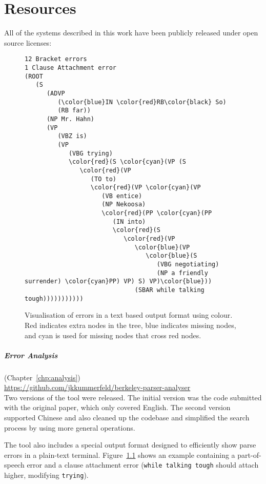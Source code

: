 \chapter{Resources}

All of the systems described in this work have been publicly released under open source licenses:

\begin{figure}
{\footnotesize
  \begin{Verbatim}[commandchars=\\\{\},codes={\catcode`$=3\catcode`^=7\catcode`_=8}]
12 Bracket errors
1 Clause Attachment error
(ROOT
   (S
      (ADVP
         (\color{blue}IN \color{red}RB\color{black} So)
         (RB far))
      (NP Mr. Hahn)
      (VP
         (VBZ is)
         (VP
            (VBG trying)
            \color{red}(S \color{cyan}(VP (S
               \color{red}(VP
                  (TO to)
                  \color{red}(VP \color{cyan}(VP
                     (VB entice)
                     (NP Nekoosa)
                     \color{red}(PP \color{cyan}(PP
                        (IN into)
                        \color{red}(S
                           \color{red}(VP
                              \color{blue}(VP
                                 \color{blue}(S
                                    (VBG negotiating)
                                    (NP a friendly surrender) \color{cyan}PP) VP) S) VP)\color{blue}))
                              (SBAR while talking tough)))))))))))
\end{Verbatim}
}
\caption{\label{fig:error-vis}
Visualisation of errors in a text based output format using colour.
Red indicates extra nodes in the tree, blue indicates missing nodes, and cyan is used for missing nodes that cross red nodes.
}
\end{figure}

\paragraph{Error Analysis} (Chapter~\ref{chp:analysis}) \\
\url{https://github.com/jkkummerfeld/berkeley-parser-analyser} \\
Two versions of the tool were released.
The initial version was the code submitted with the original paper, which only covered English.
The second version supported Chinese and also cleaned up the codebase and simplified the search process by using more general operations.

The tool also includes a special output format designed to efficiently show parse errors in a plain-text terminal.
Figure~\ref{fig:error-vis} shows an example containing a part-of-speech error and a clause attachment error (\texttt{while talking tough} should attach higher, modifying \texttt{trying}).

